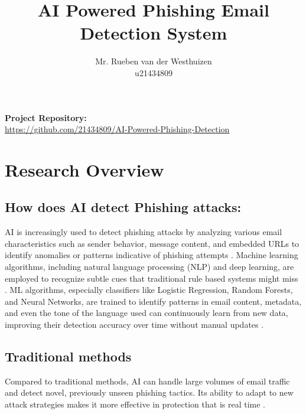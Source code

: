 \documentclass{article}
\title{AI Powered Phishing Email Detection System}
\author{Mr. Rueben van der Westhuizen \\ u21434809}
\begin{document}
\maketitle

\begin{center}
\textbf{Project Repository:} \\[0.5em]
\href{https://github.com/21434809/AI-Powered-Phishing-Detection}{https://github.com/21434809/AI-Powered-Phishing-Detection}
\end{center}

\newpage
\tableofcontents
\newpage

\section{Research Overview}

\subsection{How does AI detect Phishing attacks:}

AI is increasingly used to detect phishing attacks by analyzing various email characteristics such as sender behavior, message content, and embedded URLs to identify anomalies or patterns indicative of phishing attempts \cite{basit2021comprehensive}. Machine learning algorithms, including natural language processing (NLP) and deep learning, are employed to recognize subtle cues that traditional rule  based systems might miss \cite{Wang2020Feature} \cite{Lauriola2021An}. ML algorithms, especially classifiers like Logistic Regression, Random Forests, and Neural Networks, are trained to identify patterns in email content, metadata, and even the tone of the language used can continuously learn from new data, improving their detection accuracy over time without manual updates \cite{Karim2019A} \cite{Murti2023Machine}.

\subsection{Traditional methods}

Compared to traditional methods, AI can handle large volumes of email traffic and detect novel, previously unseen phishing tactics. Its ability to adapt to new attack strategies makes it more effective in protection that is real time \cite{Jalil2022Highly} \cite{Alsariera2020AI} \cite{Basit2020A}.
\end{document}
